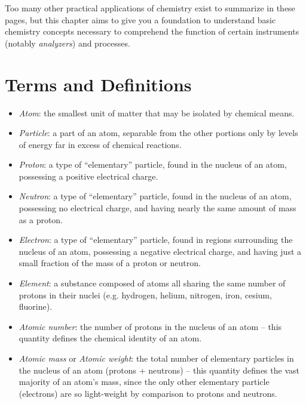 \vskip 10pt

Too many other practical applications of chemistry exist to summarize in these pages, but this chapter aims to give you a foundation to understand basic chemistry concepts necessary to comprehend the function of certain instruments (notably \textit{analyzers}) and processes.








\filbreak
\section{Terms and Definitions}

\begin{itemize}
\item \textit{Atom}: the smallest unit of matter that may be isolated by chemical means. 
\item \textit{Particle}: a part of an atom, separable from the other portions only by levels of energy far in excess of chemical reactions. 
\item \textit{Proton}: a type of ``elementary'' particle, found in the nucleus of an atom, possessing a positive electrical charge. 
\item \textit{Neutron}: a type of ``elementary'' particle, found in the nucleus of an atom, possessing no electrical charge, and having nearly the same amount of mass as a proton. 
\item \textit{Electron}: a type of ``elementary'' particle, found in regions surrounding the nucleus of an atom, possessing a negative electrical charge, and having just a small fraction of the mass of a proton or neutron. 
\item \textit{Element}: a substance composed of atoms all sharing the same number of protons in their nuclei (e.g. hydrogen, helium, nitrogen, iron, cesium, fluorine). 
\item \textit{Atomic number}: the number of protons in the nucleus of an atom -- this quantity defines the chemical identity of an atom.  
\item \textit{Atomic mass} or \textit{Atomic weight}: the total number of elementary particles in the nucleus of an atom (protons + neutrons) -- this quantity defines the vast majority of an atom's mass, since the only other elementary particle (electrons) are so light-weight by comparison to protons and neutrons.    

\end{itemize}
